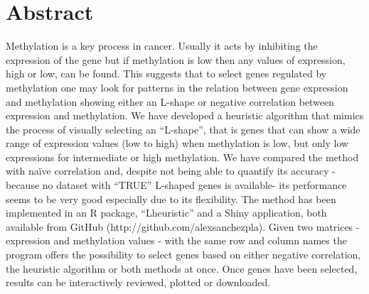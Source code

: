\documentclass[10pt,letterpaper]{article}
\newcommand{\getIndex}[2]{
  \ForEach{,}{\IfEq{#1}{\thislevelitem}{\number\thislevelcount\ExitForEach}{}}{#2}
}
\newcommand{\getAff}[1]{
  \getIndex{#1}{Universitat de Barcelona,International Rice Research Institute}
}
\begin{document}
\vspace*{0.2in}

\section*{Abstract}
Methylation is a key process in cancer. Usually it acts by inhibiting
the expression of the gene but if methylation is low then any values of
expression, high or low, can be found. This suggests that to select
genes regulated by methylation one may look for patterns in the relation
between gene expression and methylation showing either an L-shape or
negative correlation between expression and methylation. We have
developed a heuristic algorithm that mimics the process of visually
selecting an ``L-shape'', that is genes that can show a wide range of
expression values (low to high) when methylation is low, but only low
expressions for intermediate or high methylation. We have compared the
method with naïve correlation and, despite not being able to quantify
its accuracy -because no dataset with ``TRUE'' L-shaped genes is
available- its performance seems to be very good especially due to its
flexibility. The method has been implemented in an R package,
``Lheuristic'' and a Shiny application, both available from GitHub
(http://github.com/alexsanchezpla). Given two matrices -expression and
methylation values - with the same row and column names the program
offers the possibility to select genes based on either negative
correlation, the heuristic algorithm or both methods at once. Once genes
have been selected, results can be interactively reviewed, plotted or
downloaded.
\end{document}
